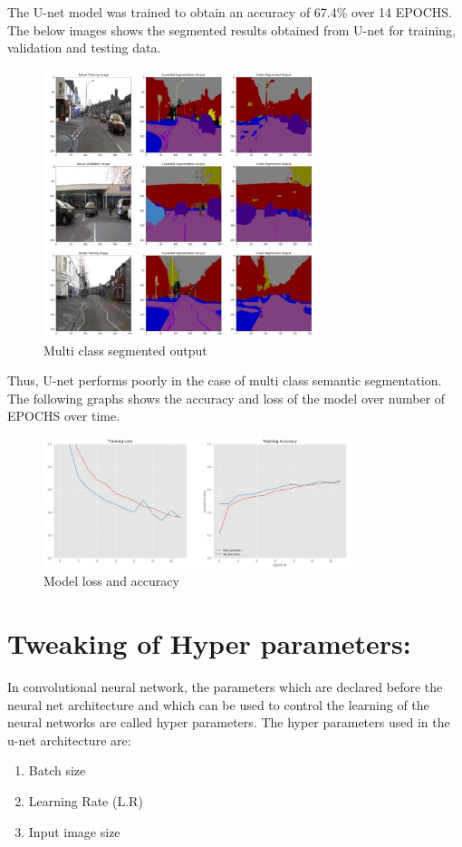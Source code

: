 \documentclass{IEEEtran}
\begin{document}
The U-net model was trained to obtain an accuracy of 67.4\% over 14 EPOCHS. The below images shows the segmented results obtained from U-net for training, validation and testing data.

\begin{figure}[h]
    \centering
    \captionsetup{justification=centering}
    \includegraphics[width=8cm]{multiclassoutput}
    \caption{Multi class segmented output}
    \label{fig:Multi class segmented output}
\end{figure}


Thus, U-net performs poorly in the case of multi class semantic segmentation. The following graphs shows the accuracy and loss of the model over number of EPOCHS over time.


\begin{figure}[h]
    \centering
    \captionsetup{justification=centering}
    \includegraphics[width=9cm]{acc}
    \caption{Model loss and accuracy}
    \label{fig:}
\end{figure}

\section{\textbf{Tweaking of Hyper parameters:}}
In convolutional neural network, the parameters which are declared before the neural net architecture and which can be used to control the learning of the neural networks are called hyper parameters. The hyper parameters used in the u-net architecture are:
\begin{enumerate}
\item Batch size
\item Learning Rate (L.R)
\item Input image size
\end{enumerate}
\end{document}
